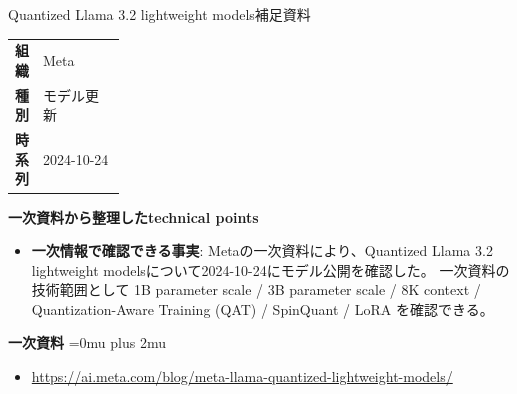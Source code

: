 \begin{technicalnote}{Quantized Llama 3.2 lightweight models}{補足資料}
\begingroup
\begin{tabularx}{\linewidth}{@{}>{\bfseries}p{0.22\linewidth}X@{}}
組織 & Meta \\
種別 & モデル更新 \\
時系列 & 2024-10-24 \\
\end{tabularx}
\smallskip
{\bfseries 一次資料から整理したtechnical points}
\begin{itemize}[leftmargin=1.5em,itemsep=0.35em]
\item \textbf{一次情報で確認できる事実}: Metaの一次資料により、Quantized Llama 3.2 lightweight modelsについて2024-10-24にモデル公開を確認した。 一次資料の技術範囲として 1B parameter scale / 3B parameter scale / 8K context / Quantization-Aware Training (QAT) / SpinQuant / LoRA を確認できる。
\end{itemize}
\begin{minipage}{\linewidth}
\begin{samepage}
{\bfseries 一次資料}
\begingroup\sloppy
\Urlmuskip=0mu plus 2mu\relax
\begin{itemize}[leftmargin=1.5em,itemsep=0.25em]
\item {\scriptsize\url{https://ai.meta.com/blog/meta-llama-quantized-lightweight-models/}}
\end{itemize}
\endgroup
\end{samepage}
\end{minipage}
\endgroup
\end{technicalnote}
\medskip
